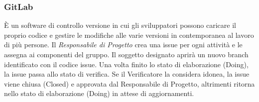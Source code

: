 \documentclass[11pt,a4paper]{article}
\begin{document}
\subsubsection{GitLab}
È un software di controllo versione in cui gli sviluppatori possono caricare il proprio codice e gestire le modifiche alle varie versioni in contemporanea al lavoro di più persone.
Il \textit{Responsabile di Progetto} crea una issue per ogni attività e le assegna ai componenti del gruppo. Il soggetto designato aprirà un nuovo branch identificato con il codice issue.
Una volta finito lo stato di elaborazione (Doing), la issue passa allo stato di verifica. Se il Verificatore la considera idonea, la issue viene chiusa (Closed) e approvata dal Responsabile di Progetto, altrimenti ritorna nello stato di elaborazione (Doing) in attese di aggiornamenti.
\end{document}
